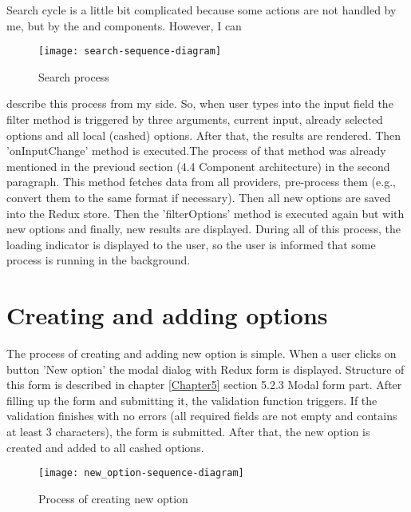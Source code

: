 \vspace{1cm}

Search cycle is a little bit complicated because some actions are not handled by me, but by the \cite{react-select} and \cite{react-virtualized-select} components. However, I can 
\begin{wrapfigure}{r}{.6\textwidth}
\texttt{[image: search-sequence-diagram]}
    \caption[Search diagram]{Search process}
    \label{fig:search}
\end{wrapfigure}
describe this process from my side. So, when user types into the input field the filter method is triggered by three arguments, current input, already selected options and all local (cashed) options. After that, the results are rendered. Then 'onInputChange' method is executed.The process of that method was already mentioned in the previoud section (4.4 Component architecture) in the second paragraph. This method fetches data from all providers, pre-process them (e.g., convert them to the same format if necessary). Then all new options are saved into the Redux store. Then the 'filterOptions' method is executed again but with new options and finally, new results are displayed. During all of this process, the loading indicator is displayed to the user, so the user is informed that some process is running in the background.



\section{Creating and adding options}

The process of creating and adding new option is simple. When a user clicks on button 'New option' the modal dialog with Redux form is displayed. Structure of this form is described in chapter \ref{Chapter5} section 5.2.3 Modal form part. After filling up the form and submitting it, the validation function triggers. If the validation finishes with no errors (all required fields are not empty and contains at least 3 characters), the form is submitted. After that, the new option is created and added to all cashed options.

\begin{figure}[h]
	\centering
    \texttt{[image: new\_option-sequence-diagram]}
    \decoRule
    \caption[New option diagram]{Process of creating new option}
    \label{fig:add_new_option}
\end{figure}

